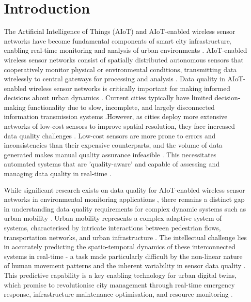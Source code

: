 \documentclass[journal,sensors,submit,pdftex,moreauthors]{Definitions/mdpi}
\begin{document}
\section{Introduction}\label{intro}

The Artificial Intelligence of Things (AIoT) and AIoT-enabled wireless sensor networks have become fundamental components of smart city infrastructure, enabling real-time monitoring and analysis of urban environments \citep{akyildizWirelessSensorNetworks2002, atzoriInternetThingsSurvey2010,smithBuildingUrbanObservatory2019}. AIoT-enabled wireless sensor networks consist of spatially distributed autonomous sensors that cooperatively monitor physical or environmental conditions, transmitting data wirelessly to central gateways for processing and analysis \citep{gubbiInternetThingsIoT2013}. Data quality in AIoT-enabled wireless sensor networks is critically important for making informed decisions about urban dynamics \citep{kleinRepresentingDataQuality2009}. Current cities typically have limited decision-making functionality due to slow, incomplete, and largely disconnected information transmission systems \citep{barrFLOODPREPAREDNOWCASTINGSYSTEM2020}.However, as cities deploy more extensive networks of low-cost sensors to improve spatial resolution, they face increased data quality challenges \citep{karkouchDataQualityInternet2016}. Low-cost sensors are more prone to errors and inconsistencies than their expensive counterparts, and the volume of data generated makes manual quality assurance infeasible \citep{tehSensorDataQuality2020}. This necessitates automated systems that are 'quality-aware' and capable of assessing and managing data quality in real-time \citep{sarrabDevelopmentIoTBased2020,buelvasDataQualityIoTBased2023}.

While significant research exists on data quality for AIoT-enabled wireless sensor networks in environmental monitoring applications \citep{vanzoestDataQualityEvaluation2021,buelvasDataQualityIoTBased2023,simsekDeepFogAQFogassistedDecentralized2024}, there remains a distinct gap in understanding data quality requirements for complex dynamic systems such as urban mobility \citep{gorsheninMobileNetworkTraffic2024}. Urban mobility represents a complex adaptive system of systems, characterised by intricate interactions between pedestrian flows, transportation networks, and urban infrastructure \citep{battyCitiesComplexityUnderstanding2007}. The intellectual challenge lies in accurately predicting the spatio-temporal dynamics of these interconnected systems in real-time - a task made particularly difficult by the non-linear nature of human movement patterns and the inherent variability in sensor data quality \citep{kleinRepresentingDataQuality2009,karkouchDataQualityInternet2016}. This predictive capability is a key enabling technology for urban digital twins, which promise to revolutionise city management through real-time emergency response, infrastructure maintenance optimisation, and resource monitoring \citep{mohammadiSmartCityDigital2017,dembskiUrbanDigitalTwins2020}.
\end{document}
